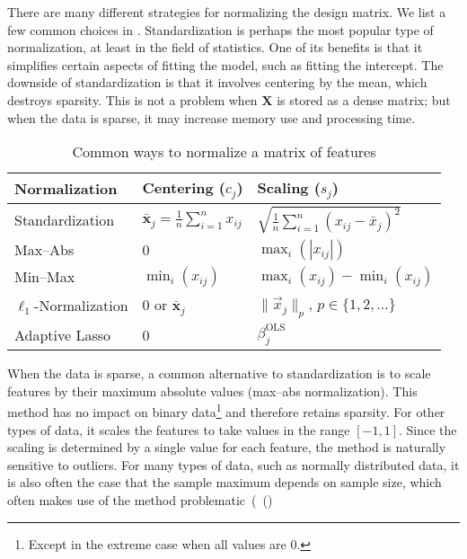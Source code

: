There are many different strategies for normalizing the design matrix. We list a few common
choices in . Standardization is perhaps the most popular type
of normalization, at least in the field of statistics. One of its benefits is that it
simplifies certain aspects of fitting the model, such as fitting the intercept. The
downside of standardization is that it involves centering by the mean, which destroys
sparsity. This is not a problem when \(\bm{X}\) is stored as a dense matrix; but when the
data is sparse, it may increase memory use and processing time.

\begin{table}[hbt]
  \centering
  \caption{Common ways to normalize a matrix of features}
  \label{tab:normalization-types}
  \begin{tabular}{lll}
    \toprule
    Normalization            & Centering (\(c_{j}\))                               & Scaling (\(s_j\))                                         \\
    \midrule
    Standardization          & \(\bar{\bm{x}}_j = \frac{1}{n}\sum_{i=1}^n x_{ij}\) & \(\sqrt{\frac{1}{n}\sum_{i=1}^n (x_{ij} - \bar{x}_j)^2}\) \\
    \addlinespace
    Max--Abs                 & 0                                                   & \(\max_i(|x_{ij}|)\)                                      \\
    \addlinespace
    Min--Max                 & \(\min_i(x_{ij})\)                                  & \(\max_i(x_{ij}) - \min_i(x_{ij})\)                       \\
    \addlinespace
    \(\ell_1\)-Normalization & 0 or \(\bm{\bar{x}}_j\)                             & \(\lVert \vec{x}_j\rVert_p\), \(p \in \{1,2,\dots\}\)     \\
    \addlinespace
    Adaptive Lasso           & 0                                                   & \(\beta_j^\text{OLS}\)                                    \\
    \bottomrule
  \end{tabular}
\end{table}

When the data is sparse, a common alternative to standardization is to scale features by
their maximum absolute values (max--abs normalization). This method has no impact on binary
data\footnote{Except in the extreme case when all values are 0.} and therefore retains
sparsity. For other types of data, it scales the features to take values in the range
\([-1, 1]\). Since the scaling is determined by a single value for each feature, the method
is naturally sensitive to outliers. For many types of data, such as normally distributed
data, it is also often the case that the sample maximum depends on sample size, which often
makes use of the method problematic~(~()

